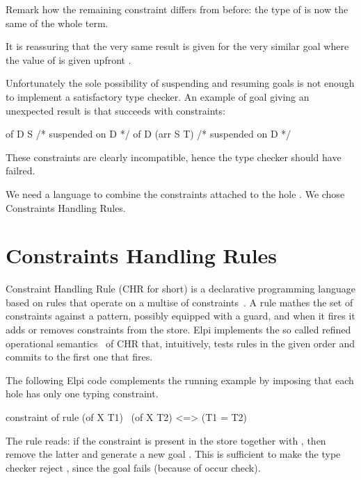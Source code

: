 \documentclass[a4paper, 11pt]{book}
\begin{document}
Remark how the remaining constraint differs from before:
the type of  is now the same 
of the whole term.

It is reassuring that the very same result is given
for the very similar goal where the value of  is given
upfront .
  
Unfortunately the sole possibility of suspending and resuming goals is
not enough to implement a satisfactory type checker. An example of
goal giving an unexpected result is 
that succeeds with constraints:

\begin{elpicode}
  of D S  /* suspended on D */
  of D (arr S T)  /* suspended on D */
\end{elpicode}

These constraints are clearly incompatible, hence the
type checker should have failred.

We need a language to combine the constraints attached to
the hole . We chose Constraints Handling Rules.

\section{Constraints Handling Rules}\label{sec:chrui}

Constraint Handling Rule (CHR for short) is a declarative
programming language based on rules that operate on
a multise of constraints~\cite{chr}.
A rule mathes the set of constraints against a
pattern, possibly equipped with a guard, and when it fires
it adds or removes constraints from the store.
Elpi implements the so called refined operational
semantics~\cite{10.1007/978-3-540-27775-0_7}
of CHR that, intuitively, tests rules in the given order
and commits to the first one that fires.

The following Elpi code complements the running example by
imposing that each hole has only one typing constraint.

\begin{elpicode}
constraint of {
  rule (of X T1) \ (of X T2) <=> (T1 = T2)
}
\end{elpicode}

The rule reads: if the constraint  is present
in the store together with , then remove
the latter and generate a new goal .
This is sufficient to make the type checker
reject , since the goal
 fails (because of occur check).
\end{document}
